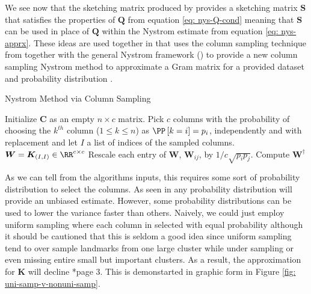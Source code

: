 We see now that the sketching matrix produced by  provides a sketching matrix $\bm{S}$ that satisfies the properties of $\bm{Q}$ from equation \ref{eq: nys-Q-cond} meaning that $\bm{S}$ can be used in place of $\bm{Q}$ within the Nystrom estimate from equation \ref{eq: nys-apprx}. These ideas are used together in  that uses the column sampling technique from  together with the general Nystrom framework () to provide a new column sampling Nystrom method to approximate a Gram matrix for a provided dataset and probability distribution \cites{JMLR:v6:drineas05a,DBLP:journals/corr/abs-1303-1849}.

{\centering
\begin{minipage}{.85\linewidth}
    \begin{algorithm}[H]
        \caption{Nystrom Method via Column Sampling}
        \label{alg: nys-col-samp}
        \SetAlgoLined
        \DontPrintSemicolon

        \BlankLine
        Initialize $\bm{C}$ as an empty $n \times c$ matrix.\;
        Pick $c$ columns with the probability of choosing the $k^{th}$ column ($1 \leq k \leq n$) as $\PP \left[ k = i \right] = p_i$, independently and with replacement and let $I$ a list of indices of the sampled columns.\;
        $\bm{W} = \bm{K}_{(I,I)} \in \RR^{c \times c}$\;
        Rescale each entry of $\bm{W}$, $\bm{W}_{ij}$, by $1 / c \sqrt{p_i p_j}$.\;
        Compute $\bm{W}^{\dagger}$\;
        \BlankLine
    \end{algorithm}
\end{minipage}
\par}

As we can tell from the algorithms inputs, this requires some sort of probability distribution to select the columns. As seen in  any probability distribution will provide an unbiased estimate. However, some probability distributions can be used to lower the variance faster than others. Naively, we could just employ uniform sampling where each column in selected with equal probability although it should be cautioned that this is seldom a good idea since uniform sampling tend to over sample landmarks from one large cluster while under sampling or even missing entire small but important clusters. As a result, the approximation for $\bm{K}$ will decline \cite{musco2017recursive}*{page 3}. This is demonstarted in graphic form in Figure \ref{fig: uni-samp-v-nonuni-samp}.

